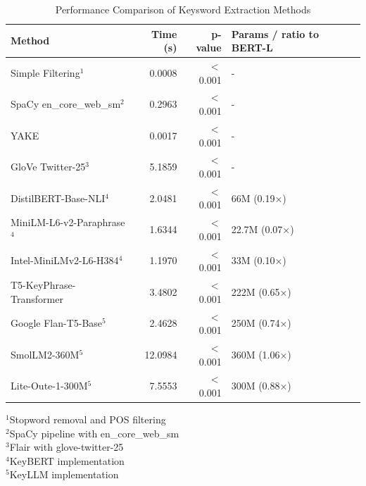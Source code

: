 \documentclass[sigconf]{acmart}
\begin{document}
\begin{table}[ht]
\caption{Performance Comparison of Keysword Extraction Methods}
\centering
\small
\setlength{\tabcolsep}{3pt}
\begin{tabular}{lrrl}
\hline
\textbf{Method} & \textbf{Time (s)} & \textbf{p-value} & \textbf{\small{Params / ratio to BERT-L}} \\
\hline
Simple Filtering$^1$ & 0.0008 & $<$0.001 & - \\
SpaCy en\_core\_web\_sm$^2$ & 0.2963 & $<$0.001 & - \\
YAKE & 0.0017 & $<$0.001 & - \\
GloVe Twitter-25$^3$ & 5.1859 & $<$0.001 & - \\
DistilBERT-Base-NLI$^4$ & 2.0481 & $<$0.001 & 66M (0.19×) \\
MiniLM-L6-v2-Paraphrase$^4$ & 1.6344 & $<$0.001 & 22.7M (0.07×) \\
Intel-MiniLMv2-L6-H384$^4$ & 1.1970 & $<$0.001 & 33M (0.10×) \\
T5-KeyPhrase-Transformer & 3.4802 & $<$0.001 & 222M (0.65×) \\
Google Flan-T5-Base$^5$ & 2.4628 & $<$0.001 & 250M (0.74×) \\
SmolLM2-360M$^5$ & 12.0984 & $<$0.001 & 360M (1.06×) \\
Lite-Oute-1-300M$^5$ & 7.5553 & $<$0.001 & 300M (0.88×) \\
\hline
\end{tabular}
\par\medskip
\footnotesize{
\begin{flushleft}
$^1$Stopword removal and POS filtering\\
$^2$SpaCy pipeline with en\_core\_web\_sm\\
$^3$Flair with glove-twitter-25\\
$^4$KeyBERT implementation\\
$^5$KeyLLM implementation\\
\end{flushleft}
}
\label{tab:method-comparison}
\end{table}
\end{document}
